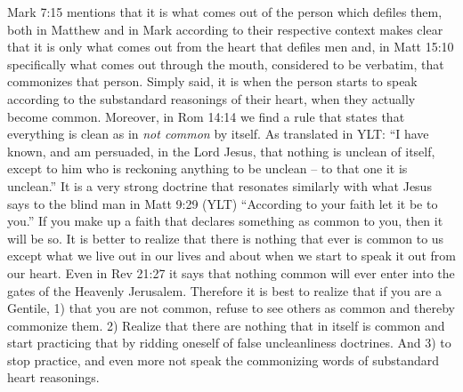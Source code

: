 Mark 7:15 mentions that it is what comes out of the person which defiles them, both in Matthew and in Mark according
to their respective context makes clear that it is only what comes out from the heart that defiles men and, in
Matt 15:10 specifically what comes out through the mouth, considered to be verbatim, that commonizes that person.
Simply said, it is when the person starts to speak according to the substandard reasonings of their heart, when
they actually become common.
Moreover, in Rom 14:14 we find a rule that states that everything is clean as in \emph{not common} by itself. As translated in YLT:
``I have known, and am persuaded, in the Lord Jesus, that nothing is unclean of itself, except to him who is reckoning
anything to be unclean -- to that one it is unclean.'' It is a very strong doctrine that resonates similarly with what
Jesus says to the blind man in Matt 9:29 (YLT) ``According to your faith let it be to you.'' If you make up a faith that
declares something as common to you, then it will be so. It is better to realize that there is nothing that ever is
common to us except what we live out in our lives and about when we start to speak it out from our heart.
Even in Rev 21:27 it says that nothing common will ever enter into the gates of the Heavenly Jerusalem. Therefore it is
best to realize that if you are a Gentile, 1) that you are not common, refuse to see others as common and thereby
commonize them. 2) Realize that there are nothing that in itself is common and start practicing that by ridding oneself
of false uncleanliness doctrines. And 3) to stop practice, and even more not speak the commonizing words of substandard
heart reasonings.



